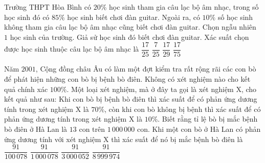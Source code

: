 \begin{ex}%
	Trường THPT Hòa Bình có $20\%$ học sinh tham gia câu lạc bộ âm nhạc, trong số học sinh đó có $85\%$ học sinh biết chơi đàn guitar. Ngoài ra, có $10\%$ số học sinh không tham gia câu lạc bộ âm nhạc  cũng biết chơi đàn guitar. Chọn ngẫu nhiên $1$ học sinh của trường. Giả sử học sinh đó biết chơi đàn guitar. Xác suất chọn được học sinh thuộc câu lạc bộ âm nhạc là
	\choice 
		{\True $\dfrac{17}{25}$} 
		{$\dfrac{7}{25}$} 
		{$\dfrac{17}{29}$} 
		 {$\dfrac{17}{75}$}
\end{ex}

\begin{ex}%
	Năm $2001$, Cộng đồng châu Âu có làm một đợt kiểm tra rất rộng rãi các con bò để phát hiện những con bò bị bệnh bò điên. Không có xét nghiệm nào cho kết quả chính xác $100\%$. Một loại xét nghiệm, mà ở đây ta gọi là xét nghiệm X, cho kết quả như sau: Khi con bò bị bệnh bò điên thì xác suất để có phản ứng dương tính trong xét nghiệm X là $70\%$, còn khi con bò không bị bệnh  thì xác suất để có phản ứng dương tính trong xét nghiệm X là $10\%$. Biết rằng tỉ lệ bò bị mắc bệnh bò điên ở Hà Lan là $13$ con trên $1\,000\,000$ con. Khi một con bò ở Hà Lan có phản ứng dương tính với xét nghiệm X thì xác suất để nó bị mắc bệnh bò điên là
	\choice 
		{$\dfrac{91}{100\,078}$} 
		{\True $\dfrac{91}{1\,000\,078}$} 
		 {$\dfrac{91}{3\,000\,052}$}
		{$\dfrac{91}{8\,999\,974}$} 
\end{ex}

